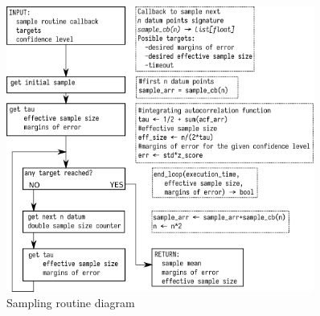 \documentclass[journal=mamobx, layout=twocolumns,manuscript=article]{achemso}
\begin{document}
\begin{figure}[t]
\includegraphics[width = 0.9\textwidth]{figures/sample_to_target_scheme.png}
\caption{Sampling routine diagram}
\label{fig: sampling_diagram}
\end{figure}


\end{document}
